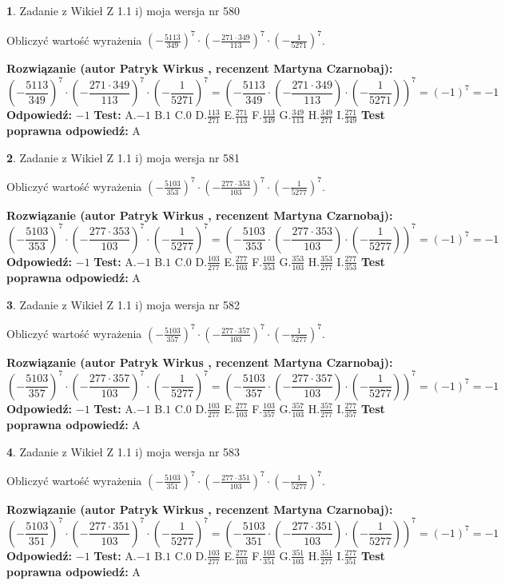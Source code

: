 \documentclass[12pt, a4paper]{article}
\theoremstyle{definition} %
\newtheorem{zad}{}
\newcommand{\zadStart}[1]{\begin{zad}#1\newline}
\newcommand{\zadStop}{\end{zad}}
\newcommand{\rozwStart}[2]{\noindent \textbf{Rozwiązanie (autor #1 , recenzent #2): }\newline}
\newcommand{\rozwStop}{\newline}
\newcommand{\odpStart}{\noindent \textbf{Odpowiedź:}\newline}
\newcommand{\odpStop}{\newline}
\newcommand{\testStart}{\noindent \textbf{Test:}\newline}
\newcommand{\testStop}{\newline}
\newcommand{\kluczStart}{\noindent \textbf{Test poprawna odpowiedź:}\newline}
\newcommand{\kluczStop}{\newline}
\begin{document}
\zadStart{Zadanie z Wikieł Z 1.1 i) moja wersja nr 580}

Obliczyć wartość wyrażenia $(-\frac{5113}{349})^{7} \cdot (-\frac{271 \cdot 349}{113})^{7} \cdot (-\frac{1}{5271})^{7}$.
\zadStop
\rozwStart{Patryk Wirkus}{Martyna Czarnobaj}
$$(-\frac{5113}{349})^{7} \cdot (-\frac{271 \cdot 349}{113})^{7} \cdot (-\frac{1}{5271})^{7} = (-\frac{5113}{349} \cdot (-\frac{271 \cdot 349}{113}) \cdot (-\frac{1}{5271}))^{7} = (-1)^{7} = -1$$
\rozwStop
\odpStart
$-1$
\odpStop
\testStart
A.$-1$ B.$1$ C.$0$ D.$\frac{113}{271}$ E.$\frac{271}{113}$
F.$\frac{113}{349}$ G.$\frac{349}{113}$
H.$\frac{349}{271}$
I.$\frac{271}{349}$
\testStop
\kluczStart
A
\kluczStop



\zadStart{Zadanie z Wikieł Z 1.1 i) moja wersja nr 581}

Obliczyć wartość wyrażenia $(-\frac{5103}{353})^{7} \cdot (-\frac{277 \cdot 353}{103})^{7} \cdot (-\frac{1}{5277})^{7}$.
\zadStop
\rozwStart{Patryk Wirkus}{Martyna Czarnobaj}
$$(-\frac{5103}{353})^{7} \cdot (-\frac{277 \cdot 353}{103})^{7} \cdot (-\frac{1}{5277})^{7} = (-\frac{5103}{353} \cdot (-\frac{277 \cdot 353}{103}) \cdot (-\frac{1}{5277}))^{7} = (-1)^{7} = -1$$
\rozwStop
\odpStart
$-1$
\odpStop
\testStart
A.$-1$ B.$1$ C.$0$ D.$\frac{103}{277}$ E.$\frac{277}{103}$
F.$\frac{103}{353}$ G.$\frac{353}{103}$
H.$\frac{353}{277}$
I.$\frac{277}{353}$
\testStop
\kluczStart
A
\kluczStop



\zadStart{Zadanie z Wikieł Z 1.1 i) moja wersja nr 582}

Obliczyć wartość wyrażenia $(-\frac{5103}{357})^{7} \cdot (-\frac{277 \cdot 357}{103})^{7} \cdot (-\frac{1}{5277})^{7}$.
\zadStop
\rozwStart{Patryk Wirkus}{Martyna Czarnobaj}
$$(-\frac{5103}{357})^{7} \cdot (-\frac{277 \cdot 357}{103})^{7} \cdot (-\frac{1}{5277})^{7} = (-\frac{5103}{357} \cdot (-\frac{277 \cdot 357}{103}) \cdot (-\frac{1}{5277}))^{7} = (-1)^{7} = -1$$
\rozwStop
\odpStart
$-1$
\odpStop
\testStart
A.$-1$ B.$1$ C.$0$ D.$\frac{103}{277}$ E.$\frac{277}{103}$
F.$\frac{103}{357}$ G.$\frac{357}{103}$
H.$\frac{357}{277}$
I.$\frac{277}{357}$
\testStop
\kluczStart
A
\kluczStop



\zadStart{Zadanie z Wikieł Z 1.1 i) moja wersja nr 583}

Obliczyć wartość wyrażenia $(-\frac{5103}{351})^{7} \cdot (-\frac{277 \cdot 351}{103})^{7} \cdot (-\frac{1}{5277})^{7}$.
\zadStop
\rozwStart{Patryk Wirkus}{Martyna Czarnobaj}
$$(-\frac{5103}{351})^{7} \cdot (-\frac{277 \cdot 351}{103})^{7} \cdot (-\frac{1}{5277})^{7} = (-\frac{5103}{351} \cdot (-\frac{277 \cdot 351}{103}) \cdot (-\frac{1}{5277}))^{7} = (-1)^{7} = -1$$
\rozwStop
\odpStart
$-1$
\odpStop
\testStart
A.$-1$ B.$1$ C.$0$ D.$\frac{103}{277}$ E.$\frac{277}{103}$
F.$\frac{103}{351}$ G.$\frac{351}{103}$
H.$\frac{351}{277}$
I.$\frac{277}{351}$
\testStop
\kluczStart
A
\kluczStop
\end{document}
